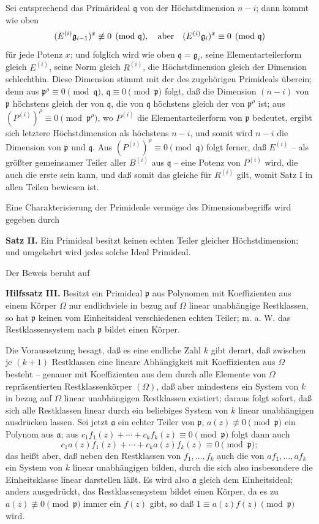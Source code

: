 \documentclass[11pt]{article}
\providecommand{\frakp}{\mathfrak p}
\providecommand{\frakq}{\mathfrak q}
\providecommand{\fraka}{\mathfrak a}
\providecommand{\frakg}{\mathfrak g}
\begin{document}
Sei entsprechend das Primärideal $\frakq$ von der Höchstdimension $n-i$; dann kommt wie oben
\[
 (E^{(i)}\frakg_{i-1})^x\not\equiv0\pmod{\frakq},\quad\hbox{aber}\quad
 (E^{(i)}\frakg_i)^x\equiv0\pmod{\frakq}
\]
für jede Potenz $x$; und folglich wird wie oben $\frakq=\frakg_i$, seine Elementarteilerform gleich $E^{(i)}$, seine Norm gleich $R^{(i)}$, die Höchstdimension gleich der Dimension schlechthin. Diese Dimension stimmt mit der des zugehörigen Primideals überein; denn aus $\frakp^\rho\equiv0\pmod{\frakq}$, $\frakq\equiv0\pmod{\frakp}$ folgt, daß die Dimension $(n-i)$ von $\frakp$ höchstens gleich der von $\frakq$, die von $\frakq$ höchstens gleich der von $\frakp^\rho$ ist; aus $(P^{(i)})^\rho\equiv0\pmod{\frakp^\rho}$, wo $P^{(i)}$ die Elementarteilerform von $\frakp$ bedeutet, ergibt sich letztere Höchstdimension als höchstens $n-i$, und somit wird $n-i$ die Dimension von $\frakp$ und $\frakq$. Aus $(P^{(i)})^\rho\equiv0\pmod{\frakq}$ folgt ferner, daß $E^{(i)}$ -- als größter gemeinsamer Teiler aller $B^{(i)}$ aus $\frakq$ -- eine Potenz von $P^{(i)}$ wird, die auch die erste sein kann, und daß somit das gleiche für $R^{(i)}$ gilt, womit Satz I in allen Teilen bewiesen ist.

Eine Charakterisierung der Primideale vermöge des Dimensionsbegriffs wird gegeben durch

\textbf{Satz II.} Ein Primideal besitzt keinen echten Teiler gleicher Höchstdimension; und umgekehrt wird jedes solche Ideal Primideal.

Der Beweis beruht auf

\textbf{Hilfssatz III.} Besitzt ein Primideal $\frakp$ aus Polynomen mit Koeffizienten aus einem Körper $\Omega$ nur endlichviele in bezug auf $\Omega$ linear unabhängige Restklassen, so hat $\frakp$ keinen vom Einheitsideal verschiedenen echten Teiler; m. a. W. das Restklassensystem nach $\frakp$ bildet einen Körper.

Die Voraussetzung besagt, daß es eine endliche Zahl $k$ gibt derart, daß zwischen je $(k+1)$ Restklassen eine lineare Abhängigkeit mit Koeffizienten aus $\Omega$ besteht -- genauer mit Koeffizienten aus dem durch alle Elemente von $\Omega$ repräsentierten Restklassenkörper $(\Omega)$, daß aber mindestens ein System von $k$ in bezug auf $\Omega$ linear unabhängigen Restklassen existiert; daraus folgt sofort, daß sich alle Restklassen linear durch ein beliebiges System von $k$ linear unabhängigen ausdrücken lassen. Sei jetzt $\fraka$ ein echter Teiler von $\frakp$, $a(z)\not\equiv0\pmod{\frakp}$ ein Polynom aus $\fraka$; aus $c_1f_1(z)+\cdots+c_kf_k(z)\equiv0\pmod{\frakp}$ folgt dann auch
\[
 c_1a(z)f_1(z)+\cdots+c_ka(z)f_k(z)\equiv0\pmod{\frakp};
\]
das heißt aber, daß neben den Restklassen von $f_1,\ldots,f_k$ auch die von $af_1,\ldots,af_k$ ein System von $k$ linear unabhängigen bilden, durch die sich also insbesondere die Einheitsklasse linear darstellen läßt. Es wird also $\fraka$ gleich dem Einheitsideal; anders ausgedrückt, das Restklassensystem bildet einen Körper, da es zu $a(z)\not\equiv0\pmod{\frakp}$ immer ein $f(z)$ gibt, so daß $1\equiv a(z)f(z)\pmod{\frakp}$ wird.
\end{document}
